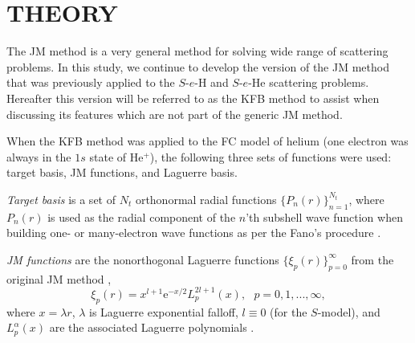 \documentclass[aip
, pra
, showpacs
, aps
, twocolumn
, groupedaddress
, floatfix
]{revtex4}
\newcommand{\beq}{\begin{equation}}
\newcommand{\eeq}{\end{equation}}
\begin{document}
\begin{table}[htb]
\begin{ruledtabular}
\begin{tabular}{rlll}




\end{tabular}
\end{ruledtabular}
\end{table}



\section{THEORY}

The JM method \cite{HY74p1201,BR76p1491} is a very general method for solving wide range of scattering problems.
In this study, we continue to develop the version of the JM method that
was previously applied to the $S$-$e$-H \cite{KB10p022708}  and $S$-$e$-He \cite{KFB11} scattering problems.
Hereafter this version will be referred to as the KFB method to assist when discussing its features which are not part of the generic JM method.

When the KFB method was applied to the FC model of helium \cite{KFB11} (one electron was always in the $1s$ state of He$^+$),
the following three sets of functions were used: target basis, JM functions, and Laguerre basis.

{\em Target basis} is a set of $N_t$ orthonormal radial functions $\{P_n(r)\}_{n=1}^{N_t}$,
where $P_n(r)$ is used as the radial component of the $n$'th subshell wave function
when building one- or many-electron wave functions as per the Fano's procedure \cite{Fano65, KFB11}.

{\em JM functions} are the nonorthogonal Laguerre functions $\{\xi_p(r)\}_{p=0}^\infty$ from the original JM method \cite{HY74p1201,BR76p1491},
\beq
\xi_p(r) = x^{l+1} \mbox{e}^{-x /2}
L_p^{2l+1}(x), \ \ \ p = 0, 1, ..., \infty,
\eeq
where $x=\lambda r$, $\lambda$ is Laguerre exponential falloff,
$l \equiv 0$ (for the $S$-model), and $L_p^{\alpha}(x)$ are the associated Laguerre polynomials \cite{abramowitz}.
\end{document}
